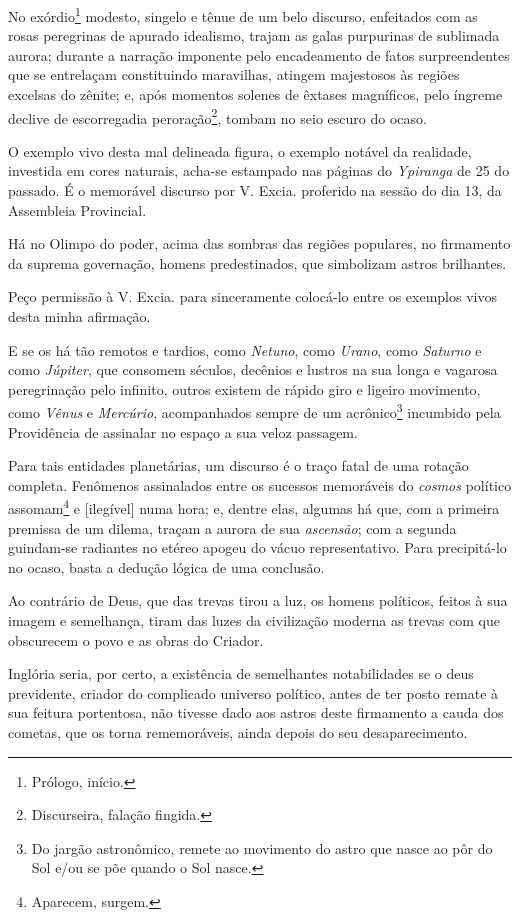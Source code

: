 No exórdio\footnote{Prólogo, início.} modesto, singelo e tênue de um
belo discurso, enfeitados com as rosas peregrinas de apurado idealismo,
trajam as galas purpurinas de sublimada aurora; durante a narração
imponente pelo encadeamento de fatos surpreendentes que se entrelaçam
constituindo maravilhas, atingem majestosos às regiões excelsas do
zênite; e, após momentos solenes de êxtases magníficos, pelo íngreme
declive de escorregadia peroração\footnote{Discurseira, falação
  fingida.}, tombam no seio escuro do ocaso.

O exemplo vivo desta mal delineada figura, o exemplo notável da
realidade, investida em cores naturais, acha-se estampado nas páginas do
\emph{Ypiranga} de 25 do passado. É o memorável discurso por V. Excia.
proferido na sessão do dia 13, da Assembleia Provincial.

Há no Olimpo do poder, acima das sombras das regiões populares, no
firmamento da suprema governação, homens predestinados, que simbolizam
astros brilhantes.

Peço permissão à V. Excia. para sinceramente colocá-lo entre os exemplos
vivos desta minha afirmação.

E se os há tão remotos e tardios, como \emph{Netuno}, como \emph{Urano},
como \emph{Saturno} e como \emph{Júpiter}, que consomem séculos,
decênios e lustros na sua longa e vagarosa peregrinação pelo infinito,
outros existem de rápido giro e ligeiro movimento, como \emph{Vênus} e
\emph{Mercúrio}, acompanhados sempre de um acrônico\footnote{Do jargão
  astronômico, remete ao movimento do astro que nasce ao pôr do Sol e/ou
  se põe quando o Sol nasce.} incumbido pela Providência de assinalar no
espaço a sua veloz passagem.

Para tais entidades planetárias, um discurso é o traço fatal de uma
rotação completa. Fenômenos assinalados entre os sucessos memoráveis do
\emph{cosmos} político assomam\footnote{Aparecem, surgem.} e
{[}ilegível{]} numa hora; e, dentre elas, algumas há que, com a primeira
premissa de um dilema, traçam a aurora de sua \emph{ascensão}; com a
segunda guindam-se radiantes no etéreo apogeu do vácuo representativo.
Para precipitá-lo no ocaso, basta a dedução lógica de uma conclusão.

Ao contrário de Deus, que das trevas tirou a luz, os homens políticos,
feitos à sua imagem e semelhança, tiram das luzes da civilização moderna
as trevas com que obscurecem o povo e as obras do Criador.

Inglória seria, por certo, a existência de semelhantes notabilidades se
o deus previdente, criador do complicado universo político, antes de ter
posto remate à sua feitura portentosa, não tivesse dado aos astros deste
firmamento a cauda dos cometas, que os torna rememoráveis, ainda depois
do seu desaparecimento.

